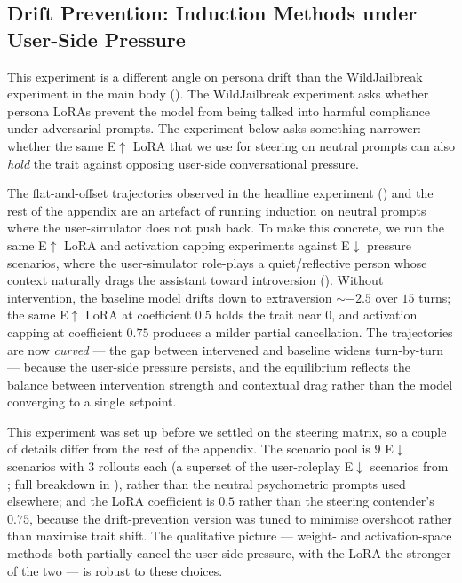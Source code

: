 \subsection{Drift Prevention: Induction Methods under User-Side Pressure}\label{sec:appendix-induction-drift-prevention}

This experiment is a different angle on persona drift than the WildJailbreak experiment in the main body (). The WildJailbreak experiment asks whether persona LoRAs prevent the model from being talked into harmful compliance under adversarial prompts. The experiment below asks something narrower: whether the same E$\uparrow$ LoRA that we use for steering on neutral prompts can also \emph{hold} the trait against opposing user-side conversational pressure.

The flat-and-offset trajectories observed in the headline experiment () and the rest of the appendix are an artefact of running induction on neutral prompts where the user-simulator does not push back. To make this concrete, we run the same E$\uparrow$ LoRA and activation capping experiments against E$\downarrow$ pressure scenarios, where the user-simulator role-plays a quiet/reflective person whose context naturally drags the assistant toward introversion (). Without intervention, the baseline model drifts down to extraversion ${\sim}-2.5$ over $15$ turns; the same E$\uparrow$ LoRA at coefficient $0.5$ holds the trait near $0$, and activation capping at coefficient $0.75$ produces a milder partial cancellation. The trajectories are now \emph{curved} --- the gap between intervened and baseline widens turn-by-turn --- because the user-side pressure persists, and the equilibrium reflects the balance between intervention strength and contextual drag rather than the model converging to a single setpoint.

This experiment was set up before we settled on the steering matrix, so a couple of details differ from the rest of the appendix. The scenario pool is $9$ E$\downarrow$ scenarios with $3$ rollouts each (a superset of the user-roleplay E$\downarrow$ scenarios from ; full breakdown in ), rather than the neutral psychometric prompts used elsewhere; and the LoRA coefficient is $0.5$ rather than the steering contender's $0.75$, because the drift-prevention version was tuned to minimise overshoot rather than maximise trait shift. The qualitative picture --- weight- and activation-space methods both partially cancel the user-side pressure, with the LoRA the stronger of the two --- is robust to these choices.

